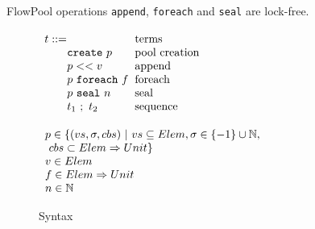 \documentclass[runningheads,a4paper]{llncs}
\newcommand{\gap}{\quad\quad}
\newcommand{\set}[1]{\{#1\}}
\newcommand{\ba}{\begin{array}}
\newcommand{\ea}{\end{array}}
\begin{document}

\begin{theorem}
FlowPool operations \verb=append=, \verb=foreach= and \verb=seal= are lock-free.
\end{theorem}


\smallrulenames

\begin{figure}[t]


\begin{minipage}[b]{5 cm}
$\ba[t]{l@{\hspace{2mm}}l}
t    ::=                                                           & \mbox{terms}              \\
\gap \texttt{create}~p                                   & \mbox{pool creation}  \\
\gap p << v                                                  & \mbox{append}           \\
\gap p~\texttt{foreach}~f                             & \mbox{foreach}           \\
\gap p~\texttt{seal}~n                                  & \mbox{seal}                \\
\gap t_1~;~t_2                                               & \mbox{sequence}        \\
\ea$
\end{minipage}
\begin{minipage}[b]{7 cm}
$\ba[t]{l@{\hspace{2mm}}l}
p \in \set{(vs, \sigma, cbs)~|~vs \subseteq Elem, \sigma \in \set{-1} \cup \mathbb{N}, \\
\text{ } cbs \subset Elem \Rightarrow Unit} \\
v \in Elem \\
f \in Elem \Rightarrow Unit \\
n \in \mathbb{N}
\ea$
\end{minipage}


\caption{Syntax}\label{fig:syntax}
\end{figure}
\end{document}
